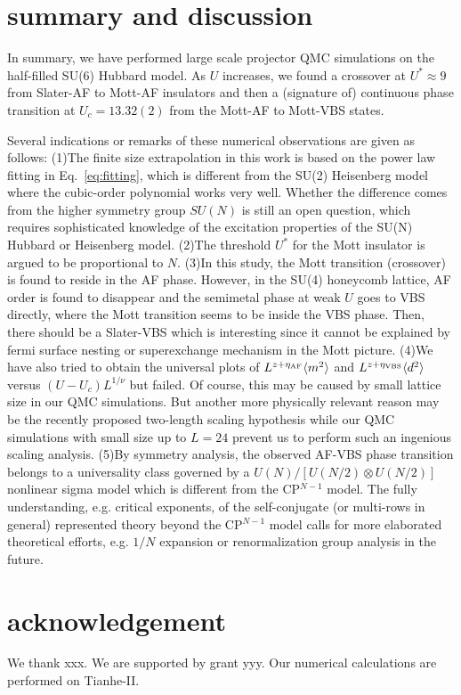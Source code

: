 \documentclass[twocolumn,superscriptaddress]{revtex4-1}
\begin{document}
\section{summary and discussion}
In summary, we have performed large scale projector QMC simulations on the half-filled SU(6) Hubbard model. As $U$ increases, we found a crossover at $U^*\approx9$ from Slater-AF to Mott-AF insulators and then a (signature of) continuous phase transition at $U_c=13.32(2)$ from the Mott-AF to Mott-VBS states. 

Several indications or remarks of these numerical observations are given as follows: 
(1)The finite size extrapolation in this work is based on the power law fitting in Eq.~\ref{eq:fitting}, which is different from the SU(2) Heisenberg model where the cubic-order polynomial works very well. \cite{Sandvik1997} Whether the difference comes from the higher symmetry group $SU(N)$ is still an open question, which requires sophisticated knowledge of the excitation properties of the SU(N) Hubbard or Heisenberg model. 
(2)The threshold $U^*$ for the Mott insulator is argued to be proportional to $N$. \cite{Zhou2016}
(3)In this study, the Mott transition (crossover) is found to reside in the AF phase. However, in the SU(4) honeycomb lattice, AF order is found to disappear and the semimetal phase at weak $U$ goes to VBS directly, where the Mott transition seems to be inside the VBS phase. \cite{Zhou2016} Then, there should be a Slater-VBS which is interesting since it cannot be explained by fermi surface nesting or superexchange mechanism in the Mott picture. 
(4)We have also tried to obtain the universal plots of $L^{z+\eta_{\rm AF}}\langle m^2 \rangle$ and $L^{z+\eta_{\rm VBS}}\langle d^2 \rangle$ versus $(U-U_c)L^{1/\nu}$ but failed. Of course, this may be caused by small lattice size in our QMC simulations. But another more physically relevant reason may be the recently proposed two-length scaling hypothesis \cite{Senthil2004,Shao2016} while our QMC simulations with small size up to $L=24$ prevent us to perform such an ingenious scaling analysis.
(5)By symmetry analysis, the observed AF-VBS phase transition belongs to a universality class governed by a $U(N)/[U(N/2)\otimes U(N/2)]$ nonlinear sigma model which is different from the CP$^{N-1}$ model. The fully understanding, e.g. critical exponents, of the self-conjugate (or multi-rows in general) represented theory beyond the CP$^{N-1}$ model calls for more elaborated theoretical efforts, e.g. $1/N$ expansion \cite{Shan-Yue Wang} or renormalization group analysis in the future.


\section{acknowledgement}
We thank xxx.
We are supported by grant yyy.
Our numerical calculations are performed on Tianhe-II. 


\end{document}
